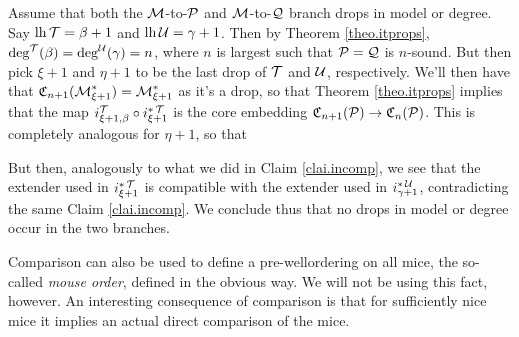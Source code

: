 {\qquad Assume that both the $\M$-to-$\P$ and $\M$-to-$\Q$ branch drops in model or degree. Say $\lh\T=\beta+1$ and $\lh\U=\gamma+1$. Then by Theorem \ref{theo.itprops}, $\deg^{\T}(\beta)=\deg^{\U}(\gamma)=n$, where $n$ is largest such that $\P=\Q$ is $n$-sound. But then pick $\xi+1$ and $\eta+1$ to be the last drop of $\T$ and $\U$, respectively. We'll then have that $\core_{n+1}(\M_{\xi+1}^*)=\M_{\xi+1}^*$ as it's a drop, so that Theorem \ref{theo.itprops} implies that the map $i_{\xi+1,\beta}^{\T}\circ i_{\xi+1}^{*\T}$ is the core embedding $\core_{n+1}(\P)\to\core_n(\P)$. This is completely analogous for $\eta+1$, so that

But then, analogously to what we did in Claim \ref{clai.incomp}, we see that the extender used in $i_{\xi+1}^{*\T}$ is compatible with the extender used in $i_{\gamma+1}^{*\U}$, contradicting the same Claim \ref{clai.incomp}. We conclude thus that no drops in model or degree occur in the two branches.
}

Comparison can also be used to define a pre-wellordering on all mice, the so-called \textit{mouse order}, defined in the obvious way. We will not be using this fact, however. An interesting consequence of comparison is that for sufficiently nice mice it implies an actual direct comparison of the mice.



